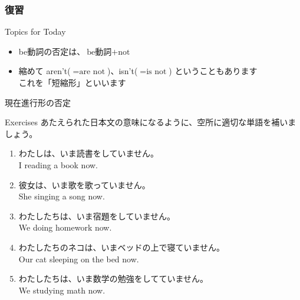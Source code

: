 \documentclass[aspectratio=169,xcolor={dvipsnames,table}]{beamer}
\newcommand{\myaudio}[1]{\href{#1}{\faVolumeUp}}
\begin{document}
\begin{frame}[plain]\frametitle{復習}
%
       \begin{exampleblock}{Topics for Today}
\begin{itemize}
 \item  be動詞の否定は、$\text{be動詞} + \text{not}$
 \item  縮めて aren't($=\text{are not}$)、isn't($=\text{is not}$) ということもあります\\
\mbox{}\hfill{}これを「短縮形」といいます
\end{itemize}
      \end{exampleblock}

\end{frame}


\begin{frame}[plain]{現在進行形の否定}
\Large

\hfill{}


\end{frame}

\begin{frame}[plain]{Exercises}
あたえられた日本文の意味になるように、空所に適切な単語を補いましょう。

\begin{enumerate}
 \item わたしは、いま読書をしていません。\\
I  reading a book now.
 \item 彼女は、いま歌を歌っていません。\\
She  singing a song now.
 \item わたしたちは、いま宿題をしていません。\\
We  doing homework now.
 \item わたしたちのネコは、いまベッドの上で寝ていません。\\
Our cat  sleeping on the bed now.
 \item わたしたちは、いま数学の勉強をしてていません。\\
We  studying math now.
\end{enumerate} 


\mbox{}\hfill\myaudio{./audio/022_is_ing_negative_02.mp3}

\end{frame}
\end{document}
